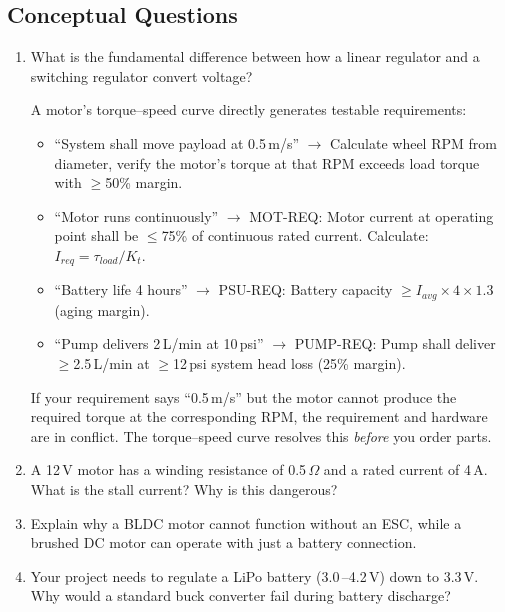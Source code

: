 \documentclass[11pt,letterpaper,twoside,openany]{book}
\begin{document}
\subsection{Conceptual Questions}

\begin{enumerate}[leftmargin=1.5em]
  \item What is the fundamental difference between how a linear regulator and a switching regulator convert voltage?

\begin{keyconceptbox}
A motor's torque--speed curve directly generates testable requirements:
\begin{itemize}[nosep,leftmargin=1.5em]
\item ``System shall move payload at 0.5\,m/s'' $\to$ Calculate wheel RPM from diameter, verify the motor's torque at that RPM exceeds load torque with $\geq$50\% margin.
\item ``Motor runs continuously'' $\to$ MOT-REQ: Motor current at operating point shall be $\leq$75\% of continuous rated current. Calculate: $I_{req} = \tau_{load} / K_t$.
\item ``Battery life 4 hours'' $\to$ PSU-REQ: Battery capacity $\geq I_{avg} \times 4 \times 1.3$ (aging margin).
\item ``Pump delivers 2\,L/min at 10\,psi'' $\to$ PUMP-REQ: Pump shall deliver $\geq$2.5\,L/min at $\geq$12\,psi system head loss (25\% margin).
\end{itemize}
If your requirement says ``0.5\,m/s'' but the motor cannot produce the required torque at the corresponding RPM, the requirement and hardware are in conflict. The torque--speed curve resolves this \emph{before} you order parts.
\end{keyconceptbox}

  \item A 12\,V motor has a winding resistance of 0.5\,$\Omega$ and a rated current of 4\,A. What is the stall current? Why is this dangerous?

  \item Explain why a BLDC motor cannot function without an ESC, while a brushed DC motor can operate with just a battery connection.

  \item Your project needs to regulate a LiPo battery (3.0\,--4.2\,V) down to 3.3\,V. Why would a standard buck converter fail during battery discharge?


\end{enumerate}
\end{document}
